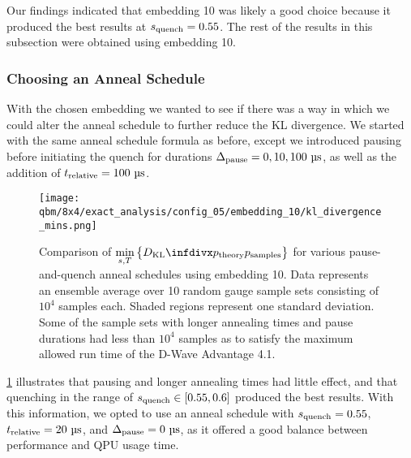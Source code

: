 Our findings indicated that embedding 10 was likely a good choice because it produced the best results at \( s_{\text{quench}} = 0.55 \).
The rest of the results in this subsection were obtained using embedding 10.

\subsubsection{Choosing an Anneal Schedule}\label{sec:choosing_an_anneal_schedule}
With the chosen embedding we wanted to see if there was a way in which we could alter the anneal schedule to further reduce the KL divergence.
We started with the same anneal schedule formula as before, except we introduced pausing before initiating the quench for durations \( \Deltapause = 0, 10, 100 \ \si{\micro\second} \), as well as the addition of \( t_{\text{relative}} = 100 \ \si{\micro\second} \).

\begin{figure}[!htb]
    \begin{center}
        \texttt{[image: qbm/8x4/exact\_analysis/config\_05/embedding\_10/kl\_divergence\_mins.png]}
    \end{center}
    \caption{
        Comparison of \( \min\limits_{s,T}\big\{\DKL{\ptheory}{\psamples}\big\} \) for various pause-and-quench anneal schedules using embedding 10.
        Data represents an ensemble average over 10 random gauge sample sets consisting of \( 10^4 \) samples each.
        Shaded regions represent one standard deviation.
        Some of the sample sets with longer annealing times and pause durations had less than \( 10^4 \) samples as to satisfy the maximum allowed run time of the D-Wave Advantage 4.1.
    }
    \label{fig:dkl_mins_embedding_05}
\end{figure}

\cref{fig:dkl_mins_embedding_05} illustrates that pausing and longer annealing times had little effect, and that quenching in the range of \( s_{\text{quench}} \in [0.55, 0.6] \) produced the best results.
With this information, we opted to use an anneal schedule with \( s_{\text{quench}} = 0.55 \), \( \trelative = 20 \ \si{\micro\second} \), and \( \Delta_{\text{pause}} = 0 \ \si{\micro\second} \), as it offered a good balance between performance and QPU usage time.

